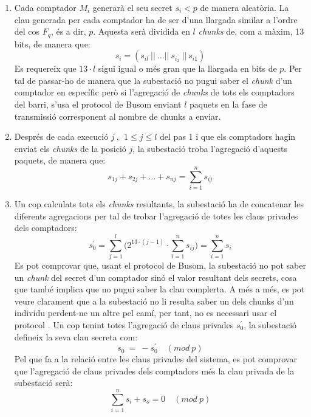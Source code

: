 \documentclass{article}
\begin{document}
\begin{enumerate}
	\item Cada comptador $M_i$ generarà el seu secret $s_i < p$ de manera aleatòria. La clau generada per cada comptador ha de ser d'una llargada similar a l'ordre del cos $F_q$, és a dir, $p$. Aquesta serà dividida en $l$ \textit{chunks} de, com a màxim, 13 bits, de manera que:
	\[s_i = (s_{il}\ ||\ \dots ||\ s_{i_2}\ ||\ s_{i1})\]
	Es requereix que $13 \cdot l$ sigui igual o més gran que la llargada en bits de $p$. Per tal de passar-ho de manera que la subestació no pugui saber el \textit{chunk} d'un comptador en específic però si l'agregació de \textit{chunks} de tots els comptadors del barri, s'usa el protocol de Busom \cite{busom} enviant $l$ paquets en la fase de transmissió corresponent al nombre de chunks a enviar.
	\item Després de cada execució $j \ , \ \ 1 \le j \le l$ del pas 1 i que els comptadors hagin enviat els \textit{chunks} de la posició $j$, la subestació troba l'agregació d'aquests paquets, de manera que:
	\[s_{1j} + s_{2j} + \dots + s_{nj} = \sum_{i=1}^{n} s_{ij}\]
	\item Un cop calculats tots els \textit{chunks} resultants, la subestació ha de concatenar les diferents agregacions per tal de trobar l'agregació de totes les claus privades dels comptadors:
	\[s_0^{'} = \sum_{j=1}^{l} \Big( 2^{13 \cdot (j - 1)} \cdot \sum_{i=1}^{n} s_{ij} \Big) = \sum_{i=1}^{n} s_i\]
	Es pot comprovar que, usant el protocol de Busom, la subestació no pot saber un \textit{chunk} del secret d'un comptador sinó el valor resultant dels secrets, cosa que també implica que no pugui saber la clau complerta. A més a més, es pot veure clarament que a la subestació no li resulta saber un dels chunks d'un individu perdent-ne un altre pel camí, per tant, no es necessari usar el protocol \cite{repair-busom}. Un cop tenint totes l'agregació de claus privades $s_0^{'}$, la subestació defineix la seva clau secreta com:
	\[s_0\ =\ - s_0^{'} \quad (mod \ p)\]
	Pel que fa a la relació entre les claus privades del sistema, es pot comprovar que l'agregació de claus privades dels comptadors més la clau privada de la subestació serà:
	\[\sum_{i=1}^{n} s_i + s_o = 0 \quad (mod \ p)\] 
\end{enumerate}
\end{document}
